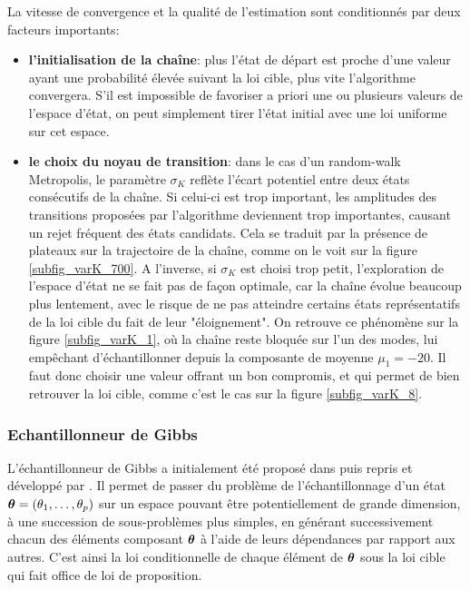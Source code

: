 La vitesse de convergence et la qualité de l'estimation sont conditionnés par deux facteurs importants: 
\begin{itemize}
	\item \textbf{l'initialisation de la chaîne}: plus l'état de départ est proche d'une valeur ayant une probabilité élevée suivant la loi cible, plus vite l'algorithme convergera. S'il est impossible de favoriser a priori une ou plusieurs valeurs de l'espace d'état, on peut simplement tirer l'état initial avec une loi uniforme sur cet espace.
	\item \textbf{le choix du noyau de transition}: dans le cas d'un random-walk Metropolis, le paramètre $\sigma_K$ reflète l'écart potentiel entre deux états consécutifs de la chaîne. Si celui-ci est trop important, les amplitudes des transitions proposées par l'algorithme deviennent trop importantes, causant un rejet fréquent des états candidats. Cela se traduit par la présence de plateaux sur la trajectoire de la chaîne, comme on le voit sur la figure \ref{subfig_varK_700}. A l'inverse, si $\sigma_K$ est choisi trop petit, l'exploration de l'espace d'état ne se fait pas de façon optimale, car la chaîne évolue beaucoup plus lentement, avec le risque de ne pas atteindre certains états représentatifs de la loi cible du fait de leur "éloignement". On retrouve ce phénomène sur la figure \ref{subfig_varK_1}, où la chaîne reste bloquée sur l'un des modes, lui empêchant d'échantillonner depuis la composante de moyenne $\mu_1 = -20$. Il faut donc choisir une valeur offrant un bon compromis, et qui permet de bien retrouver la loi cible, comme c'est le cas sur la figure \ref{subfig_varK_8}. 
\end{itemize}

\subsubsection{Echantillonneur de Gibbs}
L'échantillonneur de Gibbs a initialement été proposé dans \cite{Geman1984} puis repris et développé par \cite{Gelfand1990}. Il permet de passer du problème de l'échantillonnage d'un état ${\bm{\theta}} = (\theta_1, \dots, \theta_p)$ sur un espace pouvant être potentiellement de grande dimension, à une succession de sous-problèmes plus simples, en générant successivement chacun des éléments composant ${\bm{\theta}}$ à l'aide de leurs dépendances par rapport aux autres. C'est ainsi la loi conditionnelle de chaque élément de ${\bm{\theta}}$ sous la loi cible qui fait office de loi de proposition.

